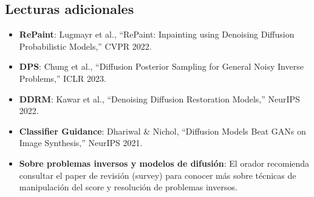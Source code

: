 \documentclass[a4paper]{article}
\begin{document}
\subsection{Lecturas adicionales}

\begin{itemize}
    \item \textbf{RePaint}: Lugmayr et al., ``RePaint: Inpainting using Denoising Diffusion Probabilistic Models,'' CVPR 2022.
    \item \textbf{DPS}: Chung et al., ``Diffusion Posterior Sampling for General Noisy Inverse Problems,'' ICLR 2023.
    \item \textbf{DDRM}: Kawar et al., ``Denoising Diffusion Restoration Models,'' NeurIPS 2022.
    \item \textbf{Classifier Guidance}: Dhariwal \& Nichol, ``Diffusion Models Beat GANs on Image Synthesis,'' NeurIPS 2021.
    \item \textbf{Sobre problemas inversos y modelos de difusión}: El orador recomienda consultar el paper de revisión (survey) para conocer más sobre técnicas de manipulación del score y resolución de problemas inversos.
\end{itemize}

\end{document}
